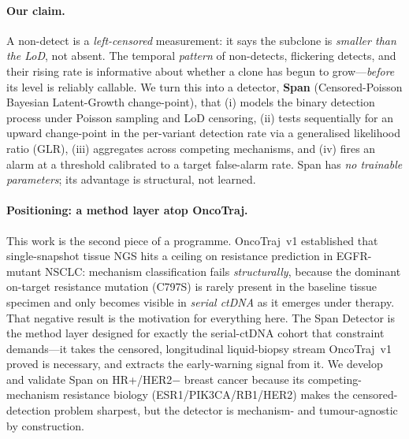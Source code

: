 \documentclass[11pt]{article}
\newcommand{\1}{\mathbf{1}}
\begin{document}
\paragraph{Our claim.}
A non-detect is a \emph{left-censored} measurement: it says the subclone is
\emph{smaller than the LoD}, not absent. The temporal \emph{pattern} of
non-detects, flickering detects, and their rising rate is informative about
whether a clone has begun to grow---\emph{before} its level is reliably callable.
We turn this into a detector, \textbf{Span} (Censored-Poisson Bayesian
Latent-Growth change-point), that (i) models the binary detection process under
Poisson sampling and LoD censoring, (ii) tests sequentially for an upward
change-point in the per-variant detection rate via a generalised likelihood ratio
(GLR), (iii) aggregates across competing mechanisms, and (iv) fires an alarm at a
threshold calibrated to a target false-alarm rate. Span has \emph{no trainable
parameters}; its advantage is structural, not learned.

\paragraph{Positioning: a method layer atop OncoTraj.}
This work is the second piece of a programme. OncoTraj~v1
\citep{sarkar2026oncotraj} established that single-snapshot tissue NGS hits a
ceiling on resistance prediction in EGFR-mutant NSCLC: mechanism classification
fails \emph{structurally}, because the dominant on-target resistance mutation
(C797S) is rarely present in the baseline tissue specimen and only becomes
visible in \emph{serial ctDNA} as it emerges under therapy. That negative result
is the motivation for everything here. The Span Detector is the method layer
designed for exactly the serial-ctDNA cohort that constraint demands---it takes
the censored, longitudinal liquid-biopsy stream OncoTraj~v1 proved is necessary,
and extracts the early-warning signal from it. We develop and validate Span on
HR+/HER2$-$ breast cancer because its competing-mechanism resistance biology
(ESR1/PIK3CA/RB1/HER2) makes the censored-detection problem sharpest, but the
detector is mechanism- and tumour-agnostic by construction.
\end{document}
